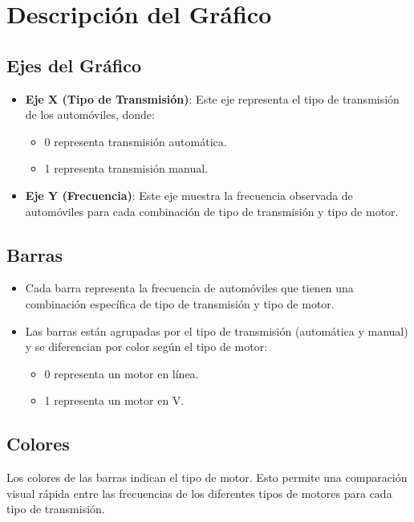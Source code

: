 \documentclass{article}
\begin{document}
\section{Descripción del Gráfico}

\subsection{Ejes del Gráfico}
\begin{itemize}
    \item \textbf{Eje X (Tipo de Transmisión)}: Este eje representa el tipo de transmisión de los automóviles, donde:
          \begin{itemize}
              \item 0 representa transmisión automática.
              \item 1 representa transmisión manual.
          \end{itemize}
    \item \textbf{Eje Y (Frecuencia)}: Este eje muestra la frecuencia observada de automóviles para cada combinación de tipo de transmisión y tipo de motor.
\end{itemize}

\subsection{Barras}
\begin{itemize}
    \item Cada barra representa la frecuencia de automóviles que tienen una combinación específica de tipo de transmisión y tipo de motor.
    \item Las barras están agrupadas por el tipo de transmisión (automática y manual) y se diferencian por color según el tipo de motor:
          \begin{itemize}
              \item 0 representa un motor en línea.
              \item 1 representa un motor en V.
          \end{itemize}
\end{itemize}

\subsection{Colores}
Los colores de las barras indican el tipo de motor. Esto permite una comparación visual rápida entre las frecuencias de los diferentes tipos de motores para cada tipo de transmisión.
\end{document}
